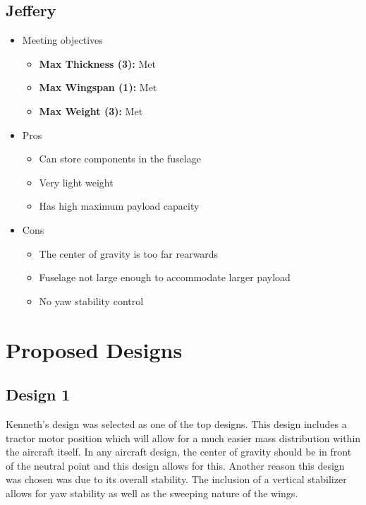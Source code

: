     \subsection{Jeffery}
    \begin{itemize}
            \item Meeting objectives
            \begin{itemize}
                \item \textbf{Max Thickness (3):} Met
                \item \textbf{Max Wingspan (1):} Met
                \item \textbf{Max Weight (3):} Met
            \end{itemize}
            \item Pros
            \begin{itemize}
                \item Can store components in the fuselage
                \item Very light weight 
                \item Has high maximum payload capacity 
            \end{itemize}
            \item Cons
            \begin{itemize}
                \item The center of gravity is too far rearwards
                \item Fuselage not large enough to accommodate larger payload
                \item No yaw stability control
            \end{itemize}
        \end{itemize}

\section{Proposed Designs}

    \subsection{Design 1}
        
        Kenneth's design was selected as one of the top designs. This design includes a tractor motor position which will allow for a much easier mass distribution within the aircraft itself. In any aircraft design, the center of gravity should be in front of the neutral point and this design allows for this. Another reason this design was chosen was due to its overall stability. The inclusion of a vertical stabilizer allows for yaw stability as well as the sweeping nature of the wings.
    
